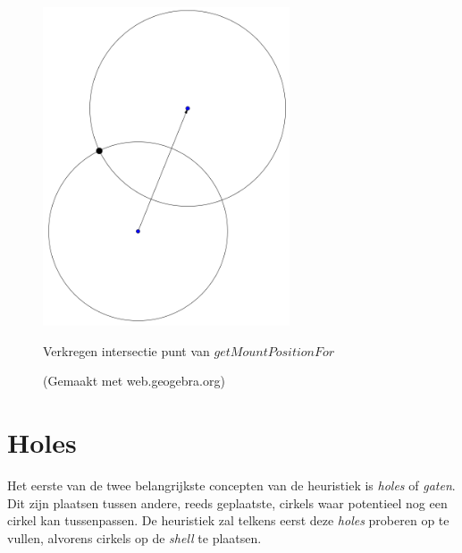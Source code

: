 \documentclass[12pt,a4paper,oneside]{book}
\begin{document}
{\begin{figure}
  \centering
  \includegraphics[width=0.65\textwidth]{cirkel-cirkel-intersectie.png}
  \caption{Verkregen intersectie punt van $getMountPositionFor$} \label{fig:cirkel-cirkel-intersectie} 
  \caption*{(Gemaakt met web.geogebra.org)}
\end{figure}

\section{Holes} \label{sec:holes}

Het eerste van de twee belangrijkste concepten van de heuristiek is \textit{holes} of \textit{gaten}.
Dit zijn plaatsen tussen andere, reeds geplaatste, cirkels waar potentieel nog een cirkel kan tussenpassen.
De heuristiek zal telkens eerst deze \textit{holes} proberen op te vullen, alvorens cirkels op de \textit{shell} te plaatsen.

}
\end{document}
